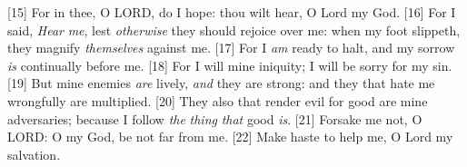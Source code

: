 [15] \textcolor[cmyk]{0.99998,1,0,0}{For in thee, O LORD, do I hope: thou wilt hear, O Lord my God.}%
[16] \textcolor[cmyk]{0.99998,1,0,0}{For I said, \emph{Hear} \emph{me}, lest \emph{otherwise} they should rejoice over me: when my foot slippeth, they magnify \emph{themselves} against me.}
[17] \textcolor[cmyk]{0.99998,1,0,0}{For I \emph{am} ready to halt, and my sorrow \emph{is} continually before me.}
[18] \textcolor[cmyk]{0.99998,1,0,0}{For I will  mine iniquity; I will be sorry for my sin.}
[19] \textcolor[cmyk]{0.99998,1,0,0}{But mine enemies \emph{are} lively, \emph{and} they are strong: and they that hate me wrongfully are multiplied.}
[20] \textcolor[cmyk]{0.99998,1,0,0}{They also that render evil for good are mine adversaries; because I follow \emph{the} \emph{thing} \emph{that} good \emph{is}.}%
[21] \textcolor[cmyk]{0.99998,1,0,0}{Forsake me not, O LORD: O my God, be not far from me.}
[22] \textcolor[cmyk]{0.99998,1,0,0}{Make haste to help me, O Lord my salvation.}







